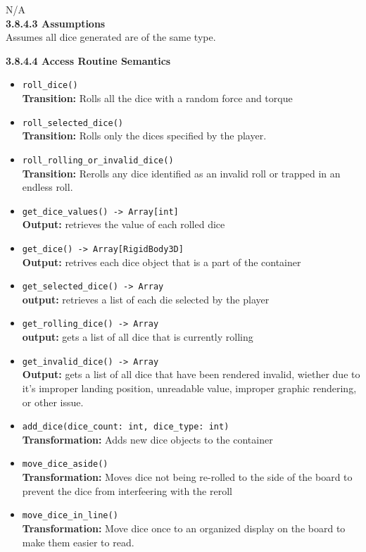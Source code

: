 \documentclass[12pt, titlepage]{article}
\begin{document}
N/A\\

\textbf{3.8.4.3 Assumptions}\\
Assumes all dice generated are of the same type.

\textbf{3.8.4.4 Access Routine Semantics}
\begin{itemize}
	\item \texttt{roll\_dice() }\\
    	\textbf{Transition:} Rolls all the dice with a random force and torque
	
	\item \texttt{roll\_selected\_dice() }\\
	\textbf{Transition:} Rolls only the dices specified by the player. 
	
	\item \texttt{roll\_rolling\_or\_invalid\_dice() }\\
	\textbf{Transition:} Rerolls any dice identified as an invalid roll or trapped in an endless roll.
	
	\item \texttt{get\_dice\_values() -> Array[int]}\\
	\textbf{Output:} retrieves the value of each rolled dice
	
	\item \texttt{get\_dice() -> Array[RigidBody3D] }\\
	\textbf{Output:} retrives each dice object that is a part of the container
	
	\item \texttt{get\_selected\_dice() -> Array }\\
	\textbf{output:} retrieves a list of each die selected by the player
	
	\item \texttt{get\_rolling\_dice() -> Array}\\
	\textbf{output:} gets a list of all dice that is currently rolling
	
	\item \texttt{get\_invalid\_dice() -> Array }\\
	\textbf{Output:} gets a list of all dice that have been rendered invalid, wiether due to it's improper landing position, unreadable value, improper graphic rendering, or other issue.
	
	\item \texttt{add\_dice(dice\_count: int, dice\_type: int)}\\
	\textbf{Transformation:} Adds new dice objects to the container
	
	\item \texttt{move\_dice\_aside() }\\
	\textbf{Transformation:} Moves dice not being re-rolled to the side of the board to prevent the dice from interfeering with the reroll
	
	\item \texttt{move\_dice\_in\_line() }\\
	\textbf{Transformation:} Move dice once to an organized display on the board to make them easier to read. 

	


\end{itemize}
\end{document}
